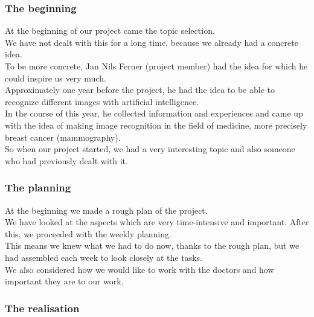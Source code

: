 \subsubsection{The beginning}

At the beginning of our project came the topic selection. \\
We have not dealt with this for a long time, because we already had a concrete idea. \\
To be more concrete, Jan Nils Ferner (project member) had the idea for which he could inspire us very much. \\ 
Approximately one year before the project, he had the idea to be able to recognize different images with artificial intelligence.\\ 
In the course of this year, he collected information and experiences and came up with the idea of making image recognition in the field of medicine, more precisely breast cancer (mammography). \\
So when our project started, we had a very interesting topic and also someone who had previously dealt with it.\\

\subsubsection{The planning}

At the beginning we made a rough plan of the project. \\
We have looked at the aspects which are very time-intensive and important. After this, we proceeded with the weekly planning. \\
This means we knew what we had to do now, thanks to the rough plan, but we had assembled each week to look closely at the tasks. \\
We also considered how we would like to work with the doctors and how important they are to our work.\\

\subsubsection{The realisation}

